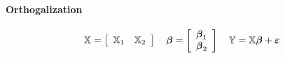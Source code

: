 \documentclass{article}
\begin{document}
\bigskip

\paragraph{Orthogalization}

\begin{equation*}
\mathbb{X}=\left[ 
\begin{array}{cc}
\mathbb{X}_{1} & \mathbb{X}_{2}%
\end{array}%
\right] \quad \boldsymbol{\beta }=\left[ 
\begin{array}{c}
\boldsymbol{\beta }_{1} \\ 
\boldsymbol{\beta }_{2}%
\end{array}%
\right] \quad \mathbb{Y}=\mathbb{X}\boldsymbol{\beta }+\boldsymbol{%
\varepsilon }
\end{equation*}
\end{document}
